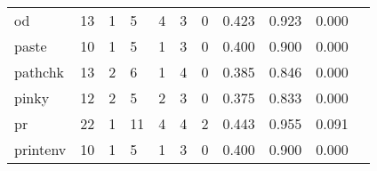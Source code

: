 \begin{longtable}{lp{1.2cm}p{1.2cm}p{1.2cm}p{1.2cm}p{1.2cm}p{1.2cm}p{1.2cm}p{1.2cm}p{1.2cm}p{1.2cm}}
od        &                                    13 &                                                  1 &                                                  5 &                                                  4 &                                                  3 &                                                  0 &                                              0.423 &                                              0.923 &                                              0.000 \\
paste     &                                    10 &                                                  1 &                                                  5 &                                                  1 &                                                  3 &                                                  0 &                                              0.400 &                                              0.900 &                                              0.000 \\
pathchk   &                                    13 &                                                  2 &                                                  6 &                                                  1 &                                                  4 &                                                  0 &                                              0.385 &                                              0.846 &                                              0.000 \\
pinky     &                                    12 &                                                  2 &                                                  5 &                                                  2 &                                                  3 &                                                  0 &                                              0.375 &                                              0.833 &                                              0.000 \\
pr        &                                    22 &                                                  1 &                                                 11 &                                                  4 &                                                  4 &                                                  2 &                                              0.443 &                                              0.955 &                                              0.091 \\
printenv  &                                    10 &                                                  1 &                                                  5 &                                                  1 &                                                  3 &                                                  0 &                                              0.400 &                                              0.900 &                                              0.000 \\

\end{longtable}
